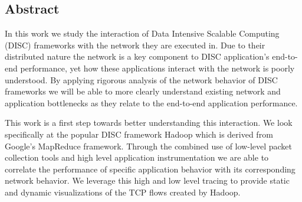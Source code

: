 \subsection*{Abstract}

In this work we study the interaction of Data Intensive Scalable Computing (DISC) 
frameworks with the network they are executed in. Due to their distributed 
nature the network is a key component to DISC application's end-to-end 
performance, yet how these applications interact with the network is poorly 
understood. By applying rigorous analysis of the network behavior of DISC frameworks
we will be able to more clearly understand existing network and application 
bottlenecks as they relate to the end-to-end application performance. 

This work is a first step towards better understanding this interaction. We 
look specifically at the popular DISC framework Hadoop which is derived 
from Google's MapReduce framework. Through the combined use of low-level packet 
collection tools and high level application instrumentation we are able to 
correlate the performance of specific application behavior with its 
corresponding network behavior. We leverage this high and low level tracing to 
provide static and dynamic visualizations of the TCP flows created by Hadoop.
